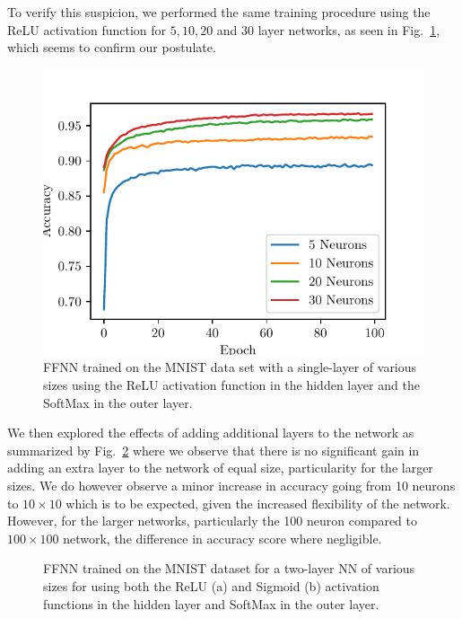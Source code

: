 \documentclass[reprint, english, nofootinbib]{revtex4-2}
\begin{document}
To verify this suspicion, we performed the same training procedure using the ReLU activation function for $5, 10, 20$ and $30$ layer networks, as seen in Fig.~\ref{fig:few neurons single layer MNIST relu}, which seems to confirm our postulate.
\begin{figure}[h!tb]
   \includegraphics[width=.5\columnwidth]{MNIST_layers_fine_ReLU.pdf}
   \caption{\label{fig:few neurons single layer MNIST relu} FFNN trained on the MNIST data set with a single-layer of various sizes using the ReLU activation function in the hidden layer and the SoftMax in the outer layer.}
\end{figure}
We then explored the effects of adding additional layers to the network as summarized by Fig.~\ref{fig: two layer MNIST relu and sigmoid} where we observe that there is no significant gain in adding an extra layer to the network of equal size, particularity for the larger sizes. We do however observe a minor increase in accuracy going from 10 neurons to $10\times 10$ which is to be expected, given the increased flexibility of the network. However, for the larger networks, particularly the 100 neuron compared to $100\times 100$ network, the difference in accuracy score where negligible.
\begin{figure}[h!tb]
    \caption{\label{fig: two layer MNIST relu and sigmoid}FFNN trained on the MNIST dataset for a two-layer NN of various sizes for using both the ReLU (a) and Sigmoid (b) activation functions in the hidden layer and SoftMax in the outer layer.}
\end{figure}
\end{document}
